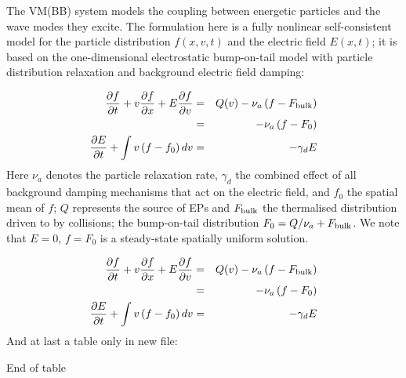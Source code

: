 The VM(BB) system models the coupling between energetic particles and the wave modes they excite.
The formulation here is a fully nonlinear self-consistent model for the particle distribution $f(x,v,t)$ and the electric field $E(x,t)$; it is based on the one-dimensional electrostatic bump-on-tail model with particle distribution relaxation and background electric field damping:

\begin{eqnarray}
\label{MVE2}
	\frac{\partial f}{\partial t} + v \frac{\partial f}{\partial x} + E \frac{\partial f}{\partial v} & = &
		Q(v) - \nu_a \left( f - F_{\rm bulk} \right) \\
		& = & - \nu_a \left( f - F_0 \right)         \\
\label{MDCE2}
	\frac{\partial E}{\partial t} + \int v \left( f - f_0 \right) dv & = & - \gamma_d E
\end{eqnarray}
%
Here $\nu_a$ denotes the particle relaxation rate, $\gamma_d$ the combined effect of all background damping mechanisms that act on the electric field, and $f_0$ the spatial mean of $f$; $Q$ represents the source of EPs and $F_{\rm bulk}$ the thermalised distribution driven to by collisions; the bump-on-tail distribution $F_0 = Q / \nu_a + F_{\rm bulk}$.
We note that $E = 0$, $f = F_0$ is a steady-state spatially uniform solution.

\begin{eqnarray}
\label{MVE2}
	\frac{\partial f}{\partial t} + v \frac{\partial f}{\partial x} + E \frac{\partial f}{\partial v} & = &
		Q(v) - \nu_a \left( f - F_{\rm bulk} \right) \\
		& = & - \nu_a \left( f - F_0 \right)         \\
\label{MDCE2}
	\frac{\partial E}{\partial t} + \int v \left( f - f_0 \right) dv & = & - \gamma_d E
\end{eqnarray}
%
And at last a table only in new file:



End of table
\endinput
There is some more text which should be ignored

